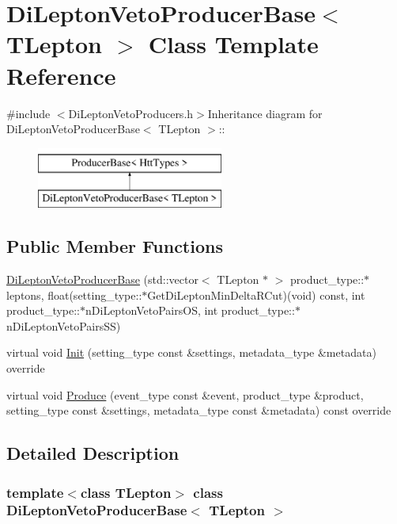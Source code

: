 \hypertarget{classDiLeptonVetoProducerBase}{
\section{DiLeptonVetoProducerBase$<$ TLepton $>$ Class Template Reference}
\label{classDiLeptonVetoProducerBase}
}


{\ttfamily \#include $<$DiLeptonVetoProducers.h$>$}Inheritance diagram for DiLeptonVetoProducerBase$<$ TLepton $>$::\begin{figure}[H]
\begin{center}
\leavevmode
\includegraphics[height=2cm]{classDiLeptonVetoProducerBase}
\end{center}
\end{figure}
\subsection*{Public Member Functions}
\begin{DoxyCompactItemize}
\item 
\hyperlink{classDiLeptonVetoProducerBase_a7d2ee9e3c268259e5f754e78555d9e2b}{DiLeptonVetoProducerBase} (std::vector$<$ TLepton $\ast$ $>$ product\_\-type::$\ast$leptons, float(setting\_\-type::$\ast$GetDiLeptonMinDeltaRCut)(void) const, int product\_\-type::$\ast$nDiLeptonVetoPairsOS, int product\_\-type::$\ast$nDiLeptonVetoPairsSS)
\item 
virtual void \hyperlink{classDiLeptonVetoProducerBase_a759df02383c27e660029ce98bdac99ca}{Init} (setting\_\-type const \&settings, metadata\_\-type \&metadata) override
\item 
virtual void \hyperlink{classDiLeptonVetoProducerBase_a6b137689f07f8129c0c20be36b19e0b3}{Produce} (event\_\-type const \&event, product\_\-type \&product, setting\_\-type const \&settings, metadata\_\-type const \&metadata) const override
\end{DoxyCompactItemize}


\subsection{Detailed Description}
\subsubsection*{template$<$class TLepton$>$ class DiLeptonVetoProducerBase$<$ TLepton $>$}

